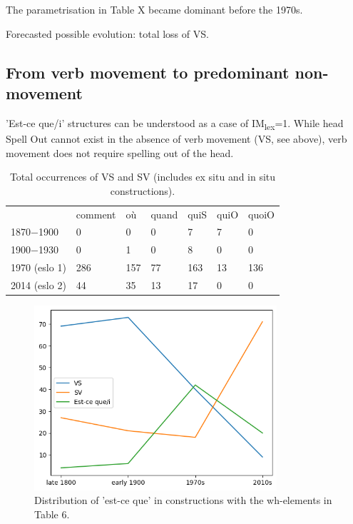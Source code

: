 \documentclass[fleqn,10pt]{wlscirep}
\begin{document}
\noindent The parametrisation in Table X became dominant before the 1970s.

\noindent Forecasted possible evolution: total loss of VS.

\subsection*{From verb movement to predominant non-movement}

'Est-ce que/i' structures can be understood as a case of IM\textsubscript{lex}=1. While head Spell Out cannot exist in the absence of verb movement (VS, see above), verb movement does not require spelling out of the head.

\begin{table}[H]
    \centering
    \large
        \begin{tabular}{l|l|l|l|l|l|l}
        \hline
        {} & comment & où & quand & quiS & quiO & quoiO \\
        1870$-$1900 & 0 & 0 & 0 & 7 & 7 & 0 \\
        1900$-$1930 & 0 & 1 & 0 & 8 & 0 & 0 \\
        1970 (eslo 1) & 286 & 157 & 77 & 163 & 13 & 136 \\
        2014 (eslo 2) & 44 & 35 & 13 & 17 & 0 & 0 \\
        \hline
        \end{tabular}
\caption{\label{tab:samp8}Total occurrences of VS and SV (includes ex situ and in situ constructions).}
\end{table}

\begin{figure}[H]
    \centering
    \includegraphics[width=90mm]{images/estceque.png} %
    \caption{Distribution of 'est-ce que' in constructions with the wh-elements in Table 6.}
    \label{fig:boat4}
  \end{figure}
\end{document}
